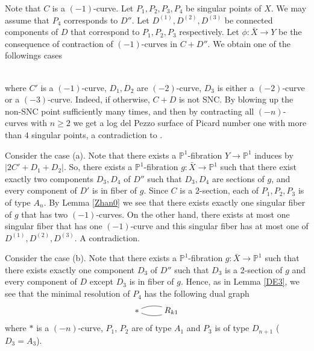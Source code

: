 \documentclass[10pt,oneside,reqno]{amsart}
\newcommand{\pp}{\mathbb{P}}
\theoremstyle{definition}
\theoremstyle{remark}
\numberwithin{equation}{section}
\begin{document}
Note that $C$ is a $(-1)$-curve. Let $P_1, P_2, P_3, P_4$ be singular points of $X$. We may assume that $P_4$ corresponds to $D''$. Let $D^{(1)},D^{(2)},D^{(3)}$ be connected components of $D$ that correspond to $P_1,P_2,P_3$ respectively. Let $\phi\colon\bar{X}\rightarrow Y$ be the consequence of contraction of $(-1)$-curves in $C+D''$. We obtain one of the followings cases\\
\\
where $C'$ is a $(-1)$-curve, $D_1,D_2$ are $(-2)$-curve, $D_3$ is either a $(-2)$-curve or a $(-3)$-curve. Indeed, if otherwise, $C+D$ is not SNC. By blowing up the non-SNC point sufficiently many times, and then by contracting all $(-n)$-curves with $n \geq 2$ we get a log del Pezzo surface of Picard number one with more than $4$ singular points, a contradiction to \cite{B}.

Consider the case (a). Note that there exists a $\pp^1$-fibration $Y\rightarrow\pp^1$ induces by $|2C'+D_1+D_2|$. So, there exists a $\pp^1$-fibration $g\colon\bar{X}\rightarrow\pp^1$ such that there exist exactly two components $D_3,D_4$ of $D''$ such that $D_3,D_4$ are sections of $g$, and every component of $D'$ is in fiber of $g$. Since $C$ is a $2$-section,  each of $P_1,P_2,P_3$ is of type $A_n$. By Lemma \ref{Zhan0} we see that there exists exactly one singular fiber of $g$ that has two $(-1)$-curves. On the other hand, there exists at most one singular fiber that has one $(-1)$-curve and this singular fiber has at most one of $D^{(1)},D^{(2)},D^{(3)}$. A contradiction.

Consider the case (b). Note that there exists a $\pp^1$-fibration $g\colon\bar{X}\rightarrow\pp^1$ such that there exists exactly one component $D_3$ of $D''$ such that $D_3$ is a 2-section of $g$ and every component of $D$ except $D_3$ is in fiber of $g$. Hence, as in Lemma \ref{DE3}, we see that the minimal resolution of $P_4$ has the following dual graph
$$\xymatrix@R=0.8em{
\ast \ar@{-}@/^/[r]\ar@{-}@/_/[r] & R_{k1}
}$$
where $\ast$ is a $(-n)$-curve, $P_1$, $P_2$ are of type $A_1$ and $P_3$ is of type $D_{n+1}$ ($D_3=A_3$).
\end{document}
